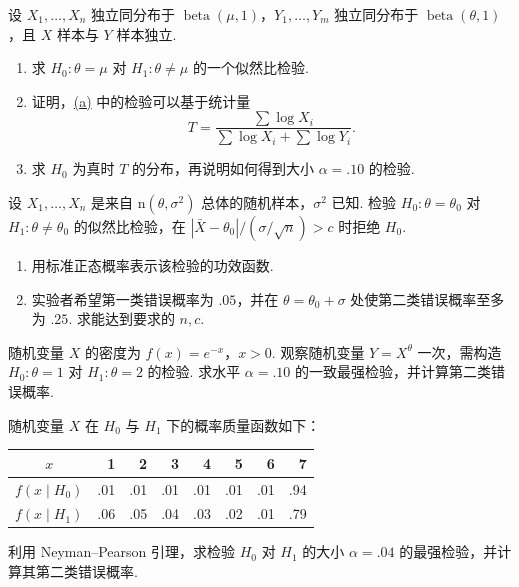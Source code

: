 \begin{exercise}\label{exercise:8.17}
设 $X_1,\ldots,X_n$ 独立同分布于 $\operatorname{beta}(\mu,1)$，$Y_1,\ldots,Y_m$ 独立同分布于 $\operatorname{beta}(\theta,1)$，且 $X$ 样本与 $Y$ 样本独立.
\begin{enumerate}
\item{}\label{itm:exercise:8.17:a} 求 $H_0:\theta=\mu$ 对 $H_1:\theta\ne\mu$ 的一个似然比检验.
\item 证明，\hyperref[itm:exercise:8.17:a]{(a)} 中的检验可以基于统计量
$$T=\frac{\sum\log X_i}{\sum\log X_i+\sum\log Y_i}.$$
\item 求 $H_0$ 为真时 $T$ 的分布，再说明如何得到大小 $\alpha=.10$ 的检验.
\end{enumerate}
\end{exercise}
\begin{exercise}\label{exercise:8.18}
设 $X_1,\ldots,X_n$ 是来自 $\mathrm n(\theta,\sigma^2)$ 总体的随机样本，$\sigma^2$ 已知. 检验 $H_0:\theta=\theta_0$ 对 $H_1:\theta\ne\theta_0$ 的似然比检验，在 $|\bar X-\theta_0|/(\sigma/\sqrt n)>c$ 时拒绝 $H_0$.
\begin{enumerate}
\item 用标准正态概率表示该检验的功效函数.
\item 实验者希望第一类错误概率为 $.05$，并在 $\theta=\theta_0+\sigma$ 处使第二类错误概率至多为 $.25$. 求能达到要求的 $n,c$.
\end{enumerate}
\end{exercise}
\begin{exercise}\label{exercise:8.19}
随机变量 $X$ 的密度为 $f(x)=e^{-x}$，$x>0$. 观察随机变量 $Y=X^\theta$ 一次，需构造 $H_0:\theta=1$ 对 $H_1:\theta=2$ 的检验. 求水平 $\alpha=.10$ 的一致最强检验，并计算第二类错误概率.
\end{exercise}
\begin{exercise}\label{exercise:8.20}
随机变量 $X$ 在 $H_0$ 与 $H_1$ 下的概率质量函数如下：
\begin{center}\begin{tabular}{c|rrrrrrr}\toprule
$x$&1&2&3&4&5&6&7\\\midrule
$f(x\mid H_0)$&.01&.01&.01&.01&.01&.01&.94\\
$f(x\mid H_1)$&.06&.05&.04&.03&.02&.01&.79\\\bottomrule
\end{tabular}\end{center}
利用 Neyman–Pearson 引理，求检验 $H_0$ 对 $H_1$ 的大小 $\alpha=.04$ 的最强检验，并计算其第二类错误概率.
\end{exercise}
